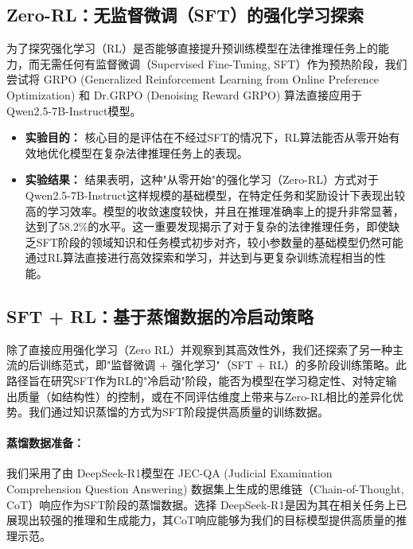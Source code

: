 \documentclass{pkuthesis}
\newcommand{\qwen}{Qwen2.5-7B-Instruct}
\newcommand{\deepseekr}{DeepSeek-R1}
\begin{document}
\subsection{Zero-RL：无监督微调（SFT）的强化学习探索}
\label{sec:zero_rl_revised}
为了探究强化学习（RL）是否能够直接提升预训练模型在法律推理任务上的能力，而无需任何有监督微调（Supervised Fine-Tuning, SFT）作为预热阶段，我们尝试将 GRPO (Generalized Reinforcement Learning from Online Preference Optimization) 和 Dr.GRPO (Denoising Reward GRPO) 算法直接应用于 \qwen 模型。
\begin{itemize}
    \item \textbf{实验目的：} 核心目的是评估在不经过SFT的情况下，RL算法能否从零开始有效地优化模型在复杂法律推理任务上的表现。
    \item \textbf{实验结果：} 结果表明，这种"从零开始"的强化学习（Zero-RL）方式对于\qwen 这样规模的基础模型，在特定任务和奖励设计下表现出较高的学习效率。模型的收敛速度较快，并且在推理准确率上的提升非常显著，达到了58.2\%的水平。这一重要发现揭示了对于复杂的法律推理任务，即使缺乏SFT阶段的领域知识和任务模式初步对齐，较小参数量的基础模型仍然可能通过RL算法直接进行高效探索和学习，并达到与更复杂训练流程相当的性能。
\end{itemize}

\subsection{SFT + RL：基于蒸馏数据的冷启动策略}
\label{sec:sft_rl_revised}
除了直接应用强化学习（Zero RL）并观察到其高效性外，我们还探索了另一种主流的后训练范式，即"监督微调 + 强化学习"（SFT + RL）的多阶段训练策略。此路径旨在研究SFT作为RL的"冷启动"阶段，能否为模型在学习稳定性、对特定输出质量（如结构性）的控制，或在不同评估维度上带来与Zero-RL相比的差异化优势。我们通过知识蒸馏的方式为SFT阶段提供高质量的训练数据。

\paragraph{蒸馏数据准备：}
我们采用了由 \deepseekr 模型在 JEC-QA (Judicial Examination Comprehension Question Answering) 数据集上生成的思维链（Chain-of-Thought, CoT）响应作为SFT阶段的蒸馏数据。选择 \deepseekr 是因为其在相关任务上已展现出较强的推理和生成能力，其CoT响应能够为我们的目标模型提供高质量的推理示范。
\end{document}
